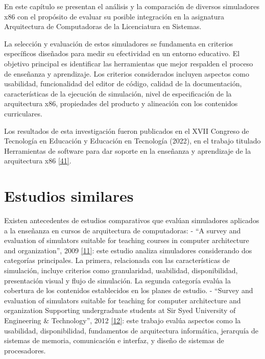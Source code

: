 \documentclass[12pt,oneside]{templates/unerthesis}
\begin{document}
En este capítulo se presentan el análisis y la comparación de diversos simuladores x86 con el propósito de evaluar su posible integración en la asignatura Arquitectura de Computadoras de la Licenciatura en Sistemas.

La selección y evaluación de estos simuladores se fundamenta en criterios específicos diseñados para medir su efectividad en un entorno educativo. El objetivo principal es identificar las herramientas que mejor respalden el proceso de enseñanza y aprendizaje. Los criterios considerados incluyen aspectos como usabilidad, funcionalidad del editor de código, calidad de la documentación, características de la ejecución de simulación, nivel de especificación de la arquitectura x86, propiedades del producto y alineación con los contenidos curriculares.

Los resultados de esta investigación fueron publicados en el XVII Congreso de Tecnología en Educación y Educación en Tecnología (2022), en el trabajo titulado Herramientas de software para dar soporte en la enseñanza y aprendizaje de la arquitectura x86 \protect\hyperlink{ref-colombani_herramientas_2022}{{[}41{]}}.

\hypertarget{estudios-similares}{%
\section{Estudios similares}\label{estudios-similares}}

Existen antecedentes de estudios comparativos que evalúan simuladores aplicados a la enseñanza en cursos de arquitectura de computadoras:
- ``A survey and evaluation of simulators suitable for teaching courses in computer architecture and organization'', 2009 \protect\hyperlink{ref-nikolic_survey_2009}{{[}11{]}}: este estudio analiza simuladores considerando dos categorías principales. La primera, relacionada con las características de simulación, incluye criterios como granularidad, usabilidad, disponibilidad, presentación visual y flujo de simulación. La segunda categoría evalúa la cobertura de los contenidos establecidos en los planes de estudio.
- ``Survey and evaluation of simulators suitable for teaching for computer architecture and organization Supporting undergraduate students at Sir Syed University of Engineering \& Technology'', 2012 \protect\hyperlink{ref-hasan_survey_2012}{{[}12{]}}: este trabajo evalúa aspectos como la usabilidad, disponibilidad, fundamentos de arquitectura informática, jerarquía de sistemas de memoria, comunicación e interfaz, y diseño de sistemas de procesadores.
\end{document}
